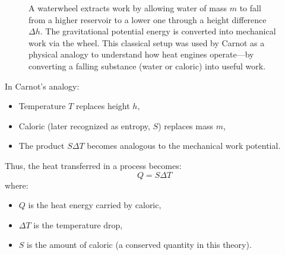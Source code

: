 \begin{figure}[H]
\centering
{}
\caption{
A waterwheel extracts work by allowing water of mass \( m \) to fall from a higher reservoir to a lower one through a height difference \( \Delta h \). The gravitational potential energy is converted into mechanical work via the wheel. This classical setup was used by Carnot as a physical analogy to understand how heat engines operate—by converting a falling substance (water or caloric) into useful work.
}
\end{figure}





In Carnot’s analogy:
\begin{itemize}
  \item Temperature \( T \) replaces height \( h \),
  \item Caloric (later recognized as entropy, \( S \)) replaces mass \( m \),
  \item The product \( S \Delta T \) becomes analogous to the mechanical work potential.
\end{itemize}

Thus, the heat transferred in a process becomes:
\[
Q = S \Delta T
\]
where:
\begin{itemize}
  \item \( Q \) is the heat energy carried by caloric,
  \item \( \Delta T \) is the temperature drop,
  \item \( S \) is the amount of caloric (a conserved quantity in this theory).
\end{itemize}





